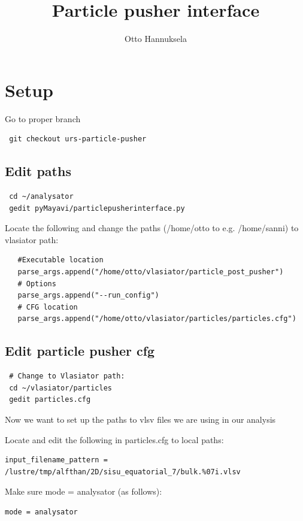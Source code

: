 \documentclass[a4paper,10pt]{article}
\title{Particle pusher interface}
\author{Otto Hannuksela}
\begin{document}
\maketitle

\section{Setup}

Go to proper branch

\begin{verbatim}
 git checkout urs-particle-pusher
\end{verbatim}

\subsection{Edit paths}

\begin{verbatim}
 cd ~/analysator
 gedit pyMayavi/particlepusherinterface.py
\end{verbatim}

Locate the following and change the paths (/home/otto to e.g. /home/sanni) to vlasiator path:

\begin{verbatim}
   #Executable location
   parse_args.append("/home/otto/vlasiator/particle_post_pusher")
   # Options
   parse_args.append("--run_config")
   # CFG location
   parse_args.append("/home/otto/vlasiator/particles/particles.cfg")
\end{verbatim}

\subsection{Edit particle pusher cfg}

\begin{verbatim}
 # Change to Vlasiator path:
 cd ~/vlasiator/particles
 gedit particles.cfg
\end{verbatim}

Now we want to set up the paths to vlsv files we are using in our analysis

Locate and edit the following in particles.cfg to local paths:

\begin{verbatim}
input_filename_pattern = /lustre/tmp/alfthan/2D/sisu_equatorial_7/bulk.%07i.vlsv
\end{verbatim}

Make sure mode = analysator (as follows):
\begin{verbatim}
mode = analysator
\end{verbatim}
\end{document}
